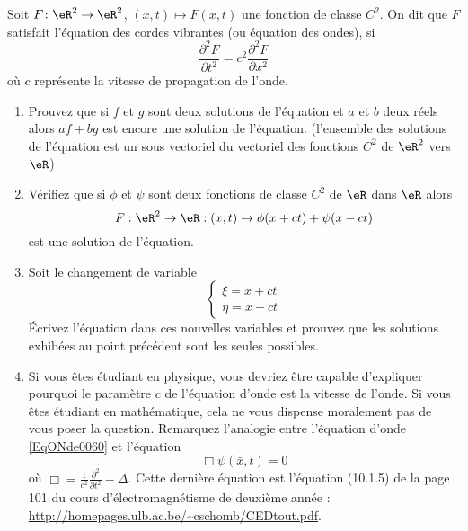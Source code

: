 
\begin{exercice}\label{exo0060}

Soit $F\colon \eR^2\to \eR^2$,  $(x,t) \mapsto F(x,t)$ une fonction de classe $C^2$. On dit que $F$ satisfait l'équation des cordes vibrantes (ou équation des ondes), si 
\begin{equation}		\label{EqONde0060}
	\frac{\partial^2 F}{\partial t^2 } = c^2 \frac{\partial^2 F}{\partial x^2}
\end{equation}
 où $c$ représente la vitesse de propagation de l'onde.

\begin{enumerate}
\item
Prouvez que si $f$ et $g$ sont deux solutions de l'équation et $a$ et $b$ deux réels alors $af+bg$ est  encore une solution de l'équation.  (l'ensemble des solutions de l'équation est un sous vectoriel du vectoriel des fonctions $C^2$ de $\eR^2$ vers $\eR$)
\item

Vérifiez que si $\phi$ et $\psi$ sont deux fonctions de classe $C^2$ de
$\eR$ dans $\eR$ alors
\[
F: \eR^2 \rightarrow \eR: (x,t) \rightarrow \phi(x+ct) + \psi(x-ct)
\]
est une solution de l'équation.
\item
Soit le changement de variable
\[
\left\{ \begin{array}{l} \xi = x + c t \\ \eta = x-ct \end{array} \right.
\]
Écrivez l'équation dans ces nouvelles variables et prouvez que les
solutions exhibées au point précédent sont les seules possibles.

\item
Si vous êtes étudiant en physique, vous devriez être capable d'expliquer pourquoi le paramètre $c$ de l'équation d'onde est la vitesse de l'onde. Si vous êtes étudiant en mathématique, cela ne vous dispense moralement pas de vous poser la question. Remarquez l'analogie entre l'équation d'onde \eqref{EqONde0060} et l'équation 
\begin{equation}
	\Box \psi(\bar x,t)=0
\end{equation}
où $\Box =\frac{1}{ c^2 }\frac{ \partial^2 }{ \partial t^2 }-\Delta$. Cette dernière équation est l'équation (10.1.5) de la page 101 du cours d'électromagnétisme de deuxième année :\\
\url{http://homepages.ulb.ac.be/~cschomb/CEDtout.pdf}.

\end{enumerate}


\end{exercice}

